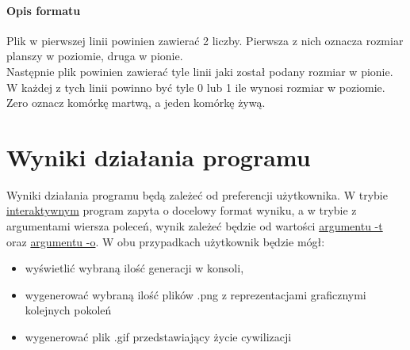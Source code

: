 \documentclass{report}
\begin{document}
\subsubsection*{Opis formatu}
Plik w pierwszej linii powinien zawierać 2 liczby. Pierwsza z nich oznacza rozmiar planszy w poziomie, druga w pionie. \\
Następnie plik powinien zawierać tyle linii jaki został podany rozmiar w pionie. W każdej z tych linii powinno być tyle 0 lub 1 ile wynosi rozmiar w poziomie. \\
Zero oznacz komórkę martwą, a jeden komórkę żywą.

\chapter{Wyniki działania programu}
Wyniki działania programu będą zależeć od preferencji użytkownika. W trybie \hyperref[interaktywny]{\textcolor{LinkColor}{interaktywnym}} program zapyta o docelowy format wyniku, a w trybie z argumentami wiersza poleceń, wynik zależeć będzie od wartości  \hyperref[output_args]{\textcolor{LinkColor}{argumentu -t}} oraz \hyperref[output_dest]{\textcolor{LinkColor}{argumentu -o}}. W obu przypadkach użytkownik będzie mógł:
\begin{itemize}
\item wyświetlić wybraną ilość generacji w konsoli,
\item wygenerować wybraną ilość plików .png z reprezentacjami graficznymi kolejnych pokoleń
\item wygenerować plik .gif przedstawiający życie cywilizacji
\end{itemize}
\end{document}
